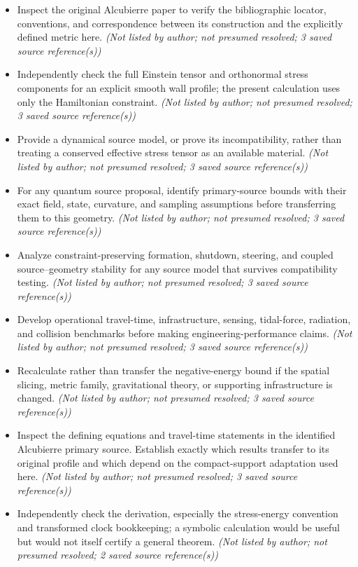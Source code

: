 \documentclass[11pt]{article}
\begin{document}
\begin{itemize}
\item Inspect the original Alcubierre paper to verify the bibliographic locator, conventions, and correspondence between its construction and the explicitly defined metric here. \textit{ (Not listed by author; not presumed resolved; 3 saved source reference(s))}
\item Independently check the full Einstein tensor and orthonormal stress components for an explicit smooth wall profile; the present calculation uses only the Hamiltonian constraint. \textit{ (Not listed by author; not presumed resolved; 3 saved source reference(s))}
\item Provide a dynamical source model, or prove its incompatibility, rather than treating a conserved effective stress tensor as an available material. \textit{ (Not listed by author; not presumed resolved; 3 saved source reference(s))}
\item For any quantum source proposal, identify primary-source bounds with their exact field, state, curvature, and sampling assumptions before transferring them to this geometry. \textit{ (Not listed by author; not presumed resolved; 3 saved source reference(s))}
\item Analyze constraint-preserving formation, shutdown, steering, and coupled source–geometry stability for any source model that survives compatibility testing. \textit{ (Not listed by author; not presumed resolved; 3 saved source reference(s))}
\item Develop operational travel-time, infrastructure, sensing, tidal-force, radiation, and collision benchmarks before making engineering-performance claims. \textit{ (Not listed by author; not presumed resolved; 3 saved source reference(s))}
\item Recalculate rather than transfer the negative-energy bound if the spatial slicing, metric family, gravitational theory, or supporting infrastructure is changed. \textit{ (Not listed by author; not presumed resolved; 3 saved source reference(s))}
\item Inspect the defining equations and travel-time statements in the identified Alcubierre primary source. Establish exactly which results transfer to its original profile and which depend on the compact-support adaptation used here. \textit{ (Not listed by author; not presumed resolved; 3 saved source reference(s))}
\item Independently check the derivation, especially the stress-energy convention and transformed clock bookkeeping; a symbolic calculation would be useful but would not itself certify a general theorem. \textit{ (Not listed by author; not presumed resolved; 2 saved source reference(s))}

\end{itemize}
\end{document}
